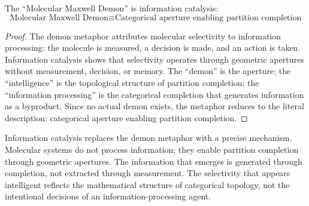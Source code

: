 \begin{theorem}
\label{thm:molecular_demon}
The ``Molecular Maxwell Demon'' is information catalysis:
\begin{equation}
\text{Molecular Maxwell Demon} \equiv \text{Categorical aperture enabling partition completion}
\end{equation}
\end{theorem}

\begin{proof}
The demon metaphor attributes molecular selectivity to information processing: the molecule is measured, a decision is made, and an action is taken. Information catalysis shows that selectivity operates through geometric apertures without measurement, decision, or memory. The ``demon'' is the aperture; the ``intelligence'' is the topological structure of partition completion; the ``information processing'' is the categorical completion that generates information as a byproduct. Since no actual demon exists, the metaphor reduces to the literal description: categorical aperture enabling partition completion.
\end{proof}

Information catalysis replaces the demon metaphor with a precise mechanism. Molecular systems do not process information; they enable partition completion through geometric apertures. The information that emerges is generated through completion, not extracted through measurement. The selectivity that appears intelligent reflects the mathematical structure of categorical topology, not the intentional decisions of an information-processing agent.
